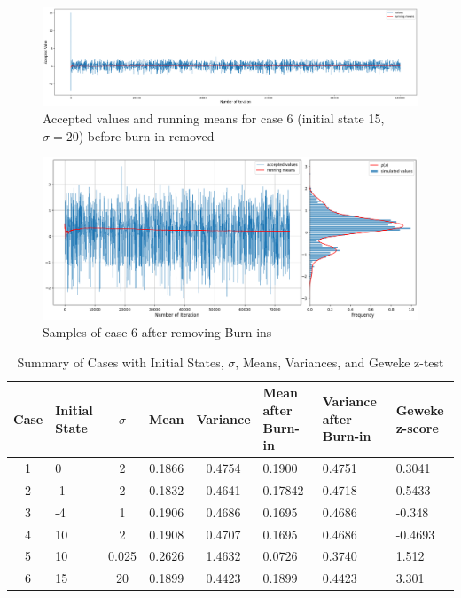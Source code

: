 \begin{example}
	\begin{figure}[H]
		\centering
		\includegraphics[width=1\textwidth]{./images/metropolis/example1/sample-6-values.png}
		\caption{Accepted values and running means for case 6 (initial state 15, $ \sigma = 20 $) before burn-in removed}
	\end{figure}

	\begin{figure}[H]
		\centering
		\includegraphics[width=1\textwidth]{./images/metropolis/example1/sample-6-value-hist-bo.png}
		\caption{Samples of case 6 after removing Burn-ins}
	\end{figure}

	\begin{table}[ht]
		\centering
		\begin{tabular}{|c|p{2cm}|c|c|c|p{2cm}|p{2cm}|p{2cm}|}
			\hline
			Case & Initial State & $\sigma$ & Mean   & Variance & Mean after Burn-in & Variance after Burn-in & Geweke z-score \\ \hline
			1    & 0             & 2        & 0.1866 & 0.4754   & 0.1900             & 0.4751                 & 0.3041         \\ \hline
			2    & -1            & 2        & 0.1832 & 0.4641   & 0.17842            & 0.4718                 & 0.5433         \\ \hline
			3    & -4            & 1        & 0.1906 & 0.4686   & 0.1695             & 0.4686                 & -0.348         \\ \hline
			4    & 10            & 2        & 0.1908 & 0.4707   & 0.1695             & 0.4686                 & -0.4693        \\ \hline
			5    & 10            & 0.025    & 0.2626 & 1.4632   & 0.0726             & 0.3740                 & 1.512          \\ \hline
			6    & 15            & 20       & 0.1899 & 0.4423   & 0.1899             & 0.4423                 & 3.301          \\ \hline
		\end{tabular}
		\caption{Summary of Cases with Initial States, $\sigma$, Means, Variances, and Geweke z-test}
	\end{table}

\end{example}


